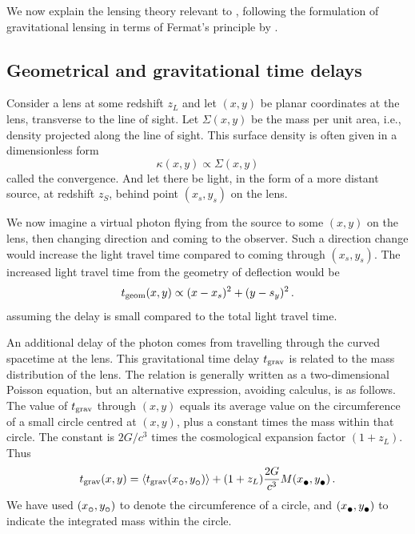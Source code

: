 We now explain the lensing theory relevant to \spl, following the
formulation of gravitational lensing in terms of Fermat's principle by
\cite{1986ApJ...310..568B}.

\subsection{Geometrical and gravitational time delays} 

Consider a lens at some redshift $z_L$ and let $(x,y)$ be planar
coordinates at the lens, transverse to the line of sight.  Let
$\Sigma(x,y)$ be the mass per unit area, i.e., density projected along
the line of sight.  This surface density is often given in a
dimensionless form
\begin{equation} \label{eq:kappa}
\kappa(x,y) \propto \Sigma(x,y)
\end{equation}
called the convergence.  And let there be light, in the form of a more
distant source, at redshift $z_S$, behind point $(x_s,y_s)$ on the
lens.

We now imagine a virtual photon flying from the source to some $(x,y)$
on the lens, then changing direction and coming to the observer.  Such
a direction change would increase the light travel time compared to
coming through $(x_s,y_s)$.  The increased light travel time from the
geometry of deflection would be
\begin{equation} \label{eq:tgeom}
t_{\rm geom}(x,y) \propto (x-x_s)^2 + (y-s_y)^2 \,.
\end{equation}
assuming the delay is small compared to the total light travel time.

An additional delay of the photon comes from travelling through the
curved spacetime at the lens.  This gravitational time delay $t_{\rm grav}$
is related to the mass distribution of the lens.  The relation is
generally written as a two-dimensional Poisson equation, but an
alternative expression, avoiding calculus, is as follows.  The value
of $t_{\rm grav}$ through $(x,y)$ equals its average value on the
circumference of a small circle centred at $(x,y)$, plus a constant
times the mass within that circle.  The constant is $2G/c^3$ times the
cosmological expansion factor $(1+z_L)$. Thus
\begin{equation} \label{eq:tgrav}
\tgrav(x,y) = \left\langle \tgrav(x_\subcirc,y_\subcirc) \right\rangle
              + (1+z_L) \frac{2G}{c^3} M(x_\subbullet,y_\subbullet) \,.
\end{equation}
We have used $(x_\subcirc,y_\subcirc)$ to denote the circumference of
a circle, and $(x_\subbullet,y_\subbullet)$ to indicate the integrated
mass within the circle.

